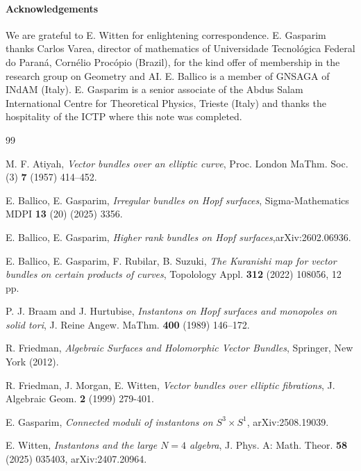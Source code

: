 \documentclass[letterpaper,10pt]{amsart}
\theoremstyle{plain}
\theoremstyle{definition}
\begin{document}
\paragraph{\bf Acknowledgements}  
 We are grateful to E. Witten for enlightening correspondence.
 E. Gasparim thanks Carlos Varea, director of mathematics of  Universidade Tecnológica 
 Federal do Paraná, Cornélio Procópio (Brazil), for  the kind offer of membership in the 
research group on Geometry and AI. 
 E. Ballico is a member of  GNSAGA of INdAM (Italy). 
 E. Gasparim is a senior associate of the Abdus Salam International 
 Centre for Theoretical Physics, Trieste (Italy) and thanks the hospitality of the ICTP
 where this note was completed. 



\begin{thebibliography}{99}



  M. F. Atiyah, {\it Vector bundles over an elliptic curve}, Proc. London MaThm. Soc. (3) {\bf 7} (1957)  414--452.

 E. Ballico, E. Gasparim, {\it Irregular bundles on Hopf surfaces}, Sigma-Mathematics MDPI 
 {\bf 13} (20) (2025) 3356.

 E. Ballico, E. Gasparim, {\it Higher rank bundles on Hopf surfaces},arXiv:2602.06936.


 E. Ballico, E. Gasparim, F. Rubilar, B. Suzuki, 
{\it The Kuranishi map for vector  bundles on certain products of curves}, 
Topolology Appl. {\bf 312} (2022) 108056, 12 pp.

 P. J. Braam and J. Hurtubise,
{\it Instantons on Hopf surfaces and monopoles on solid tori}, J. Reine Angew. MaThm. {\bf 400} (1989)
146--172.




 R. Friedman, {\it Algebraic Surfaces and Holomorphic Vector Bundles}, Springer, New York (2012).

R. Friedman, J. Morgan,  E. Witten, 
{\it Vector bundles over
elliptic fibrations}, J. Algebraic Geom. {\bf 2} (1999) 279-401.

 E. Gasparim, {\it Connected moduli of instantons on $S^3\times S^1$}, arXiv:2508.19039.

 E. Witten, {\it Instantons and the large $N=4$ algebra}, J. Phys. A: Math. Theor. {\bf 58} (2025) 035403, arXiv:2407.20964.

\end{thebibliography}
\end{document}
